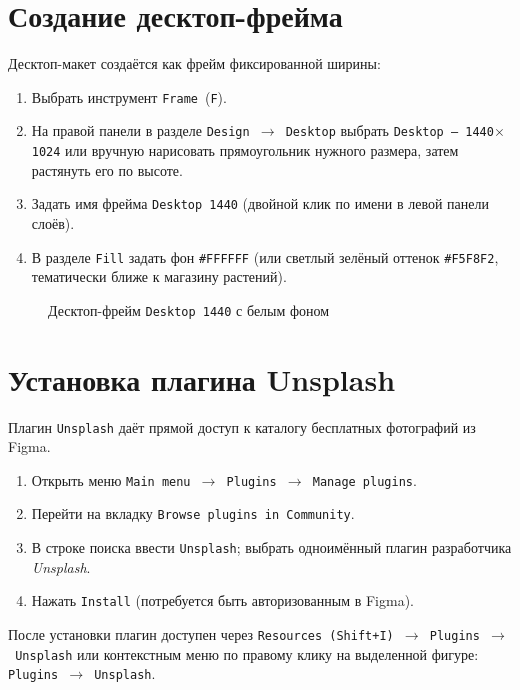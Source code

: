 \section{Создание десктоп-фрейма}

Десктоп-макет создаётся как фрейм фиксированной ширины:
\begin{enumerate}
  \item Выбрать инструмент \texttt{Frame}~(\texttt{F}).
  \item На правой панели в разделе \texttt{Design~\(\rightarrow\)~Desktop}
        выбрать \texttt{Desktop~--~1440\(\times\)1024} или вручную
        нарисовать прямоугольник нужного размера, затем растянуть его
        по высоте.
  \item Задать имя фрейма \texttt{Desktop~1440} (двойной клик по имени
        в левой панели слоёв).
  \item В разделе \texttt{Fill} задать фон \texttt{\#FFFFFF}
        (или светлый зелёный оттенок \texttt{\#F5F8F2}, тематически
        ближе к магазину растений).
\end{enumerate}

\begin{figure}[h]
  \centering
  \caption{Десктоп-фрейм \texttt{Desktop~1440} с белым фоном}
  \label{fig:frame_1440}
\end{figure}

\section{Установка плагина Unsplash}

Плагин \texttt{Unsplash} даёт прямой доступ к каталогу бесплатных
фотографий из Figma.

\begin{enumerate}
  \item Открыть меню \texttt{Main~menu~\(\rightarrow\)~Plugins~\(\rightarrow\)
        Manage plugins}.
  \item Перейти на вкладку \texttt{Browse plugins in Community}.
  \item В строке поиска ввести \texttt{Unsplash}; выбрать одноимённый
        плагин разработчика \textit{Unsplash}.
  \item Нажать \texttt{Install} (потребуется быть авторизованным
        в Figma).
\end{enumerate}

После установки плагин доступен через
\texttt{Resources~(Shift+I)~\(\rightarrow\)~Plugins~\(\rightarrow\)~Unsplash}
или контекстным меню по правому клику на выделенной фигуре:
\texttt{Plugins~\(\rightarrow\)~Unsplash}.

